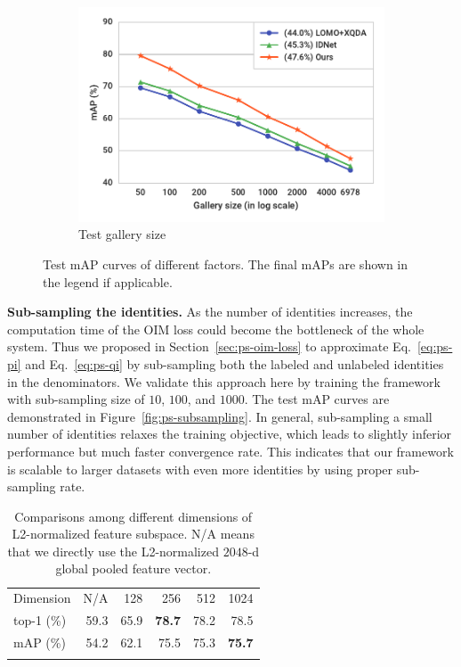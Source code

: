 \begin{figure}[t]
\begin{center}
\begin{subfigure}[t]{0.6\linewidth}
  \includegraphics[width=\linewidth]{figures/person_search/factor-gallery-size.pdf}
  \caption{Test gallery size}
  \label{fig:ps-factor-gallery-size}
\end{subfigure}
\end{center}
\caption{Test mAP curves of different factors. The final mAPs are shown in the legend if applicable.}
\end{figure}
\textbf{Sub-sampling the identities.} As the number of identities increases, the computation time of the OIM loss could become the bottleneck of the whole system. Thus we proposed in Section~\ref{sec:ps-oim-loss} to approximate Eq.~\eqref{eq:ps-pi} and Eq.~\eqref{eq:ps-qi} by sub-sampling both the labeled and unlabeled identities in the denominators. We validate this approach here by training the framework with sub-sampling size of $10$, $100$, and $1000$. The test mAP curves are demonstrated in Figure~\ref{fig:ps-subsampling}. In general, sub-sampling a small number of identities relaxes the training objective, which leads to slightly inferior performance but much faster convergence rate. This indicates that our framework is scalable to larger datasets with even more identities by using proper sub-sampling rate.

\setlength{\tabcolsep}{8pt}
\begin{table}
\begin{center}
\begin{tabular}{lrrrrr}
\hline\noalign{\smallskip}
\noalign{\smallskip}
Dimension & N/A & 128 & 256 & 512 & 1024 \\
\noalign{\smallskip}\hline\hline\noalign{\smallskip}
top-1 (\%) & 59.3 & 65.9 & \textbf{78.7} & 78.2 & 78.5 \\
mAP (\%) & 54.2 & 62.1 & 75.5 & 75.3 & \textbf{75.7} \\
\hline\noalign{\smallskip}
\end{tabular}
\end{center}
\caption{Comparisons among different dimensions of L2-normalized feature subspace. N/A means that we directly use the L2-normalized $2048$-d global pooled feature vector.}
\label{tab:ps-embed-dim}
\end{table}
\setlength{\tabcolsep}{6pt}

